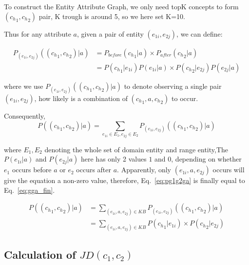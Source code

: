 To construct the Entity Attribute Graph, we only need topK concepts to form $({c_h}_1,{c_h}_2)$ pair, K trough  is around 5, so we here set K=10.

Thus for any attribute $a$, given a pair of entity $(e_{1i},e_{2j})$, we can define:

\begin{equation} \begin{split} P_{(e_{1i},e_{2j})}(({c_h}_{1},{c_h}_{2}) |a)&=P_{before}({c_h}_1|a) \times P_{after}({c_h}_2|a) \\&=  P({c_h}_{1}|e_{1i}) P(e_{1i}|a) \times P({c_h}_{2}|e_{2j})P(e_{2j}|a) \end{split} \label{eq:giga}\end{equation}


where we use $P_{(e_{1i},e_{2j})}(({c_h}_{1},{c_h}_{2}) |a)$ to denote observing a single pair $(e_{1i},e_{2j})$, how likely is a combination of $({c_h}_{1},a,{c_h}_{2})$ to occur.




Consequently,
\begin{equation} P(({c_h}_{1},{c_h}_{2}) |a)=\sum_{  e_{1i} \in E_1 ,e_{2j} \in E_2} P_{(e_{1i},e_{2j})}(({c_h}_{1},{c_h}_{2}) |a) \label{eq:pg1g2ga}\end{equation}

where $E_1,E_2$ denoting the whole set of domain entity and range entity,The  $P(e_{1i}|a)$ and $P(e_{2j}|a)$ here has only 2 values $1$ and  $0$, depending on whether  $e_1$ occurs before $a$ or $e_2$ occurs after $a$. Apparently, only $(e_{1i}, a, e_{2j})$ occurs will give the equation a non-zero value, therefore, Eq.~\ref{eq:pg1g2ga} is finally equal to Eq.~\ref{eq:gga_fin}.

\begin{equation} \begin{split} P(({c_h}_{1},{c_h}_{2}) |a) &= \sum_{  (e_{1i},a,e_{2j})\in KB } P_{(e_{1i},e_{2j})}(({c_h}_{1},{c_h}_{2}) |a) \\&=  \sum_{  (e_{1i},a,e_{2j})\in KB }P({c_h}_{1}|e_{1i}) \times P({c_h}_{2}|e_{2j})\end{split} \label{eq:gga_fin}\end{equation}





\subsection{ Calculation of $JD(c_1,c_2)$}


